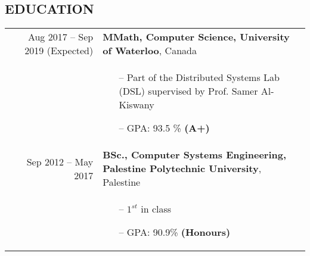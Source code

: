 \subsection*{EDUCATION}


  \begin{tabular}{@{\bf} r p{6in} }
  
       Aug 2017 -- Sep 2019 (Expected) & \textbf{ MMath,  Computer Science, University of Waterloo}, Canada\\
    & 
    \vspace*{-15pt}
    \begin{itemize}[noitemsep]
      \item[--] Part of the Distributed Systems Lab (DSL) supervised by Prof. Samer Al-Kiswany 

\item[--] GPA: 93.5	\% \bf (A+)
    \end{itemize}\\
     Sep 2012 -- May 2017 & \textbf{BSc., Computer Systems Engineering, Palestine Polytechnic University}, Palestine\\
    & 
    \vspace*{-15pt}
    \begin{itemize}[noitemsep]
   		\item[--] $1^{st}$ in class
      \item[--] GPA: 90.9\% \bf (Honours)
    \end{itemize}

  \end{tabular}